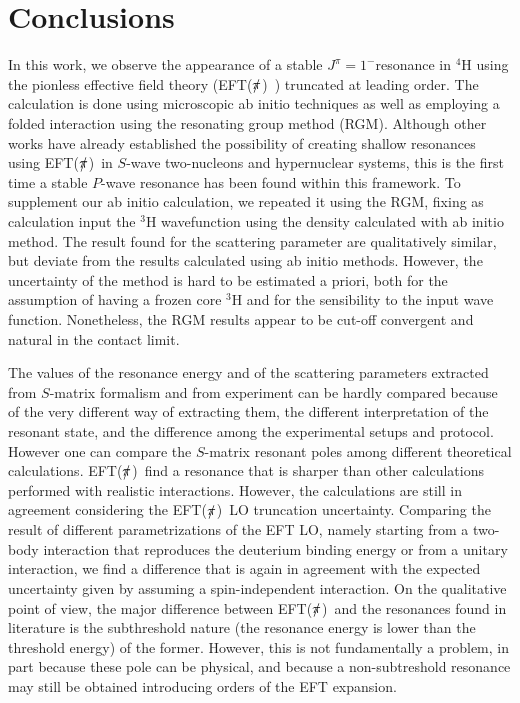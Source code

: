 \documentclass[5p,times]{elsarticle}
\newcommand{\eftnopi}{\mbox{EFT($\slashed{\pi}$) }}
\begin{document}
\section{Conclusions}
%
In this work, we observe the appearance of a stable $J^{\pi}=1^-$resonance in $^4$H using the pionless effective field theory (\eftnopi) truncated at leading order. The calculation is done using microscopic ab initio techniques as well as employing a folded interaction using the resonating group method (RGM).
%
Although other works have already established the possibility of creating shallow resonances using \eftnopi in $S$-wave two-nucleons and hypernuclear systems, this is the first time a stable $P$-wave
resonance has been found within this framework. 
%
To supplement our ab initio calculation, we repeated it using the RGM, fixing as calculation input the $^3$H wavefunction using the density calculated with ab initio method.
The result found for the scattering parameter are qualitatively similar, but deviate from the results calculated using ab initio methods.
However, the uncertainty of the method is hard to be estimated a priori, both for the assumption of having a frozen core $^3$H and for the sensibility to the input wave function.
Nonetheless, the RGM results appear to be cut-off convergent and natural in the contact limit.
%

%
The values of the resonance energy and of the scattering parameters extracted from $S$-matrix formalism and from experiment can be hardly compared because of the very different way of extracting them, the different interpretation of the resonant state, and the difference among the experimental setups and protocol. 
However one can compare the $S$-matrix resonant poles among different theoretical calculations. \eftnopi find a resonance that is sharper than other calculations performed with realistic interactions. However, the calculations are still in agreement considering the \eftnopi LO truncation uncertainty. Comparing the result of different parametrizations of the EFT LO, namely starting from a two-body interaction that reproduces the deuterium binding energy or from a unitary interaction, we find a difference that is again in agreement with the expected uncertainty given by assuming a spin-independent interaction.
%
On the qualitative point of view, the major difference between \eftnopi and the resonances found in literature is the subthreshold nature (the resonance energy is lower than the threshold energy) of the former. 
However, this is not fundamentally a problem, in part because these pole can be physical\cite{formartinanyexample}, and because a non-subtreshold resonance may still be obtained introducing orders of the EFT expansion.
%
\end{document}
